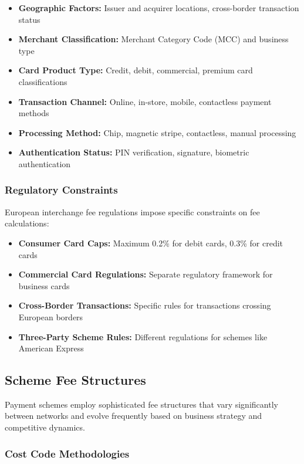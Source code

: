 \begin{itemize}
    \item \textbf{Geographic Factors:} Issuer and acquirer locations, cross-border transaction status
    \item \textbf{Merchant Classification:} Merchant Category Code (MCC) and business type
    \item \textbf{Card Product Type:} Credit, debit, commercial, premium card classifications
    \item \textbf{Transaction Channel:} Online, in-store, mobile, contactless payment methods
    \item \textbf{Processing Method:} Chip, magnetic stripe, contactless, manual processing
    \item \textbf{Authentication Status:} PIN verification, signature, biometric authentication
\end{itemize}

\subsubsection{Regulatory Constraints}

European interchange fee regulations impose specific constraints on fee calculations:

\begin{itemize}
    \item \textbf{Consumer Card Caps:} Maximum 0.2\% for debit cards, 0.3\% for credit cards
    \item \textbf{Commercial Card Regulations:} Separate regulatory framework for business cards
    \item \textbf{Cross-Border Transactions:} Specific rules for transactions crossing European borders
    \item \textbf{Three-Party Scheme Rules:} Different regulations for schemes like American Express
\end{itemize}

\subsection{Scheme Fee Structures}

Payment schemes employ sophisticated fee structures that vary significantly between networks and evolve frequently based on business strategy and competitive dynamics.

\subsubsection{Cost Code Methodologies}

